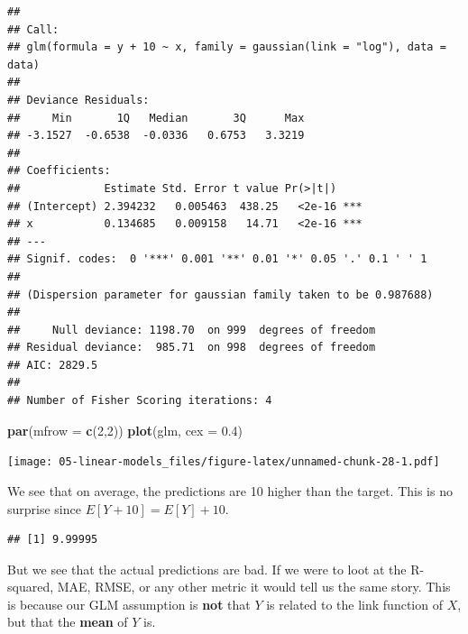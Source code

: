 \documentclass[openany]{book}
\newenvironment{Shaded}{\begin{snugshade}}{\end{snugshade}}
\newcommand{\DataTypeTok}[1]{\textcolor[rgb]{0.13,0.29,0.53}{#1}}
\newcommand{\DecValTok}[1]{\textcolor[rgb]{0.00,0.00,0.81}{#1}}
\newcommand{\FloatTok}[1]{\textcolor[rgb]{0.00,0.00,0.81}{#1}}
\newcommand{\KeywordTok}[1]{\textcolor[rgb]{0.13,0.29,0.53}{\textbf{#1}}}
\newcommand{\NormalTok}[1]{#1}
\newcommand{\OperatorTok}[1]{\textcolor[rgb]{0.81,0.36,0.00}{\textbf{#1}}}
\newcommand{\StringTok}[1]{\textcolor[rgb]{0.31,0.60,0.02}{#1}}
\begin{document}
\begin{verbatim}
## 
## Call:
## glm(formula = y + 10 ~ x, family = gaussian(link = "log"), data = data)
## 
## Deviance Residuals: 
##     Min       1Q   Median       3Q      Max  
## -3.1527  -0.6538  -0.0336   0.6753   3.3219  
## 
## Coefficients:
##             Estimate Std. Error t value Pr(>|t|)    
## (Intercept) 2.394232   0.005463  438.25   <2e-16 ***
## x           0.134685   0.009158   14.71   <2e-16 ***
## ---
## Signif. codes:  0 '***' 0.001 '**' 0.01 '*' 0.05 '.' 0.1 ' ' 1
## 
## (Dispersion parameter for gaussian family taken to be 0.987688)
## 
##     Null deviance: 1198.70  on 999  degrees of freedom
## Residual deviance:  985.71  on 998  degrees of freedom
## AIC: 2829.5
## 
## Number of Fisher Scoring iterations: 4
\end{verbatim}

\begin{Shaded}
\begin{Highlighting}[]
\KeywordTok{par}\NormalTok{(}\DataTypeTok{mfrow =} \KeywordTok{c}\NormalTok{(}\DecValTok{2}\NormalTok{,}\DecValTok{2}\NormalTok{))}
\KeywordTok{plot}\NormalTok{(glm, }\DataTypeTok{cex =} \FloatTok{0.4}\NormalTok{)}
\end{Highlighting}
\end{Shaded}

\texttt{[image: 05-linear-models\_files/figure-latex/unnamed-chunk-28-1.pdf]}

We see that on average, the predictions are 10 higher than the target. This is no surprise since \(E[Y + 10] = E[Y] + 10\).

\begin{Shaded}
\end{Shaded}

\begin{verbatim}
## [1] 9.99995
\end{verbatim}

But we see that the actual predictions are bad. If we were to loot at the R-squared, MAE, RMSE, or any other metric it would tell us the same story. This is because our GLM assumption is \textbf{not} that \(Y\) is related to the link function of \(X\), but that the \textbf{mean} of \(Y\) is.
\end{document}
